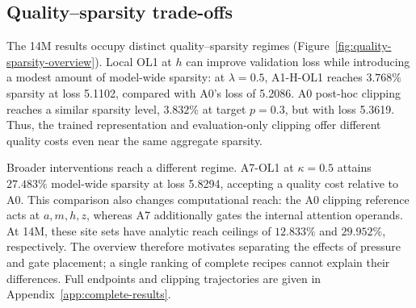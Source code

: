 \subsection{Quality--sparsity trade-offs}
\label{sec:quality-sparsity-results}

The 14M results occupy distinct quality--sparsity regimes
(Figure~\ref{fig:quality-sparsity-overview}). Local OL1 at $h$ can improve
validation loss while introducing a modest amount of model-wide sparsity:
at $\lambda=0.5$, A1-H-OL1 reaches $3.768\%$ sparsity at loss 5.1102,
compared with A0's loss of 5.2086. A0 post-hoc clipping reaches a similar
sparsity level, $3.832\%$ at target $p=0.3$, but with loss 5.3619. Thus,
the trained representation and evaluation-only clipping offer different
quality costs even near the same aggregate sparsity.

Broader interventions reach a different regime. A7-OL1 at $\kappa=0.5$
attains $27.483\%$ model-wide sparsity at loss 5.8294, accepting a quality
cost relative to A0. This comparison also changes computational reach:
the A0 clipping reference acts at $a,m,h,z$, whereas A7 additionally gates
the internal attention operands. At 14M, these site sets have analytic reach
ceilings of $12.833\%$ and $29.952\%$, respectively. The overview therefore
motivates separating the effects of pressure and gate placement; a single
ranking of complete recipes cannot explain their differences. Full endpoints
and clipping trajectories are given in Appendix~\ref{app:complete-results}.

